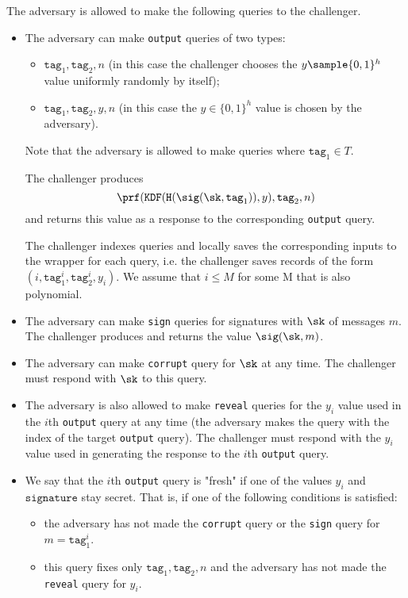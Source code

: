 \documentclass{article}
\begin{document}
{The adversary is allowed to make the following queries to the challenger.


\begin{itemize}
	
	\item The adversary can make \texttt{output} queries of two types:
	\begin{itemize}
		\item $\texttt{tag}_1, \texttt{tag}_2, n$ (in this case the challenger chooses the $y \sample \{0,1\}^h$ value uniformly randomly by itself);
		\item $\texttt{tag}_1, \texttt{tag}_2,y,n$ (in this case the $y \in \{0,1\}^h$ value is chosen by the adversary).
	\end{itemize}
	
	Note that the adversary is allowed to make queries where $\texttt{tag}_1 \in T$. 
	
	The challenger produces $$
	\prf(\texttt{KDF}(\texttt{H}(\sig (\sk,\texttt{tag}_1)), y), \texttt{tag}_2,n)
	$$
	and returns this value as a response to the corresponding \texttt{output} query.
	
	The challenger indexes queries and locally saves the corresponding inputs to the wrapper for each query, i.e. the challenger saves records of the form $(i,\texttt{tag}_1^i,\texttt{tag}_2^i,y_i)$.  We assume that $i \le M$ for some M that is also polynomial.
	
	\item The adversary can make \texttt{sign} queries for signatures with $\sk$ of messages $m$. The challenger produces and returns the value $\sig (\sk, m)$.
	
	\item The adversary can make \texttt{corrupt} query for $\sk$ at any time. The challenger must respond with $\sk$ to this query.
	
	\item The adversary is also allowed to make \texttt{reveal} queries for the $y_i$ value used in the $i$th \texttt{output} query at any time (the adversary makes the query with the index of the target \texttt{output} query). The challenger must respond with the $y_i$ value used in generating the response to the $i$th \texttt{output} query.
	
	\item We say that the $i$th \texttt{output} query is "fresh" if one of the values $y_i$ and $\mathrm{\texttt{signature}}$ stay secret. That is, if one of the following conditions is satisfied:
	\begin{itemize}
		\item the adversary has not made the \texttt{corrupt} query or the \texttt{sign} query for $m = \texttt{tag}_1^i$. 
		\item this query fixes only $\texttt{tag}_1, \texttt{tag}_2 , n$ and the adversary has not made the \texttt{reveal} query for  $y_i$.
	\end{itemize}
	

\end{itemize}}
\end{document}
